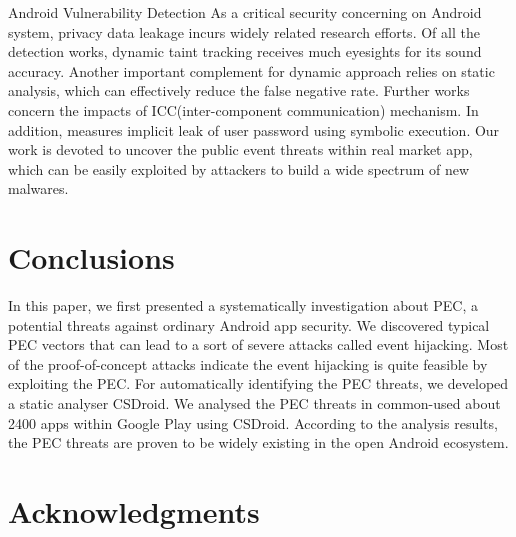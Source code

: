 \documentclass{sig-alternate-05-2015}
\begin{document}
Android Vulnerability Detection
As a critical security concerning on Android system, privacy data leakage incurs widely related research efforts. 
Of all the detection works, dynamic taint tracking \cite{enck2014taintdroid}\cite{klieber2014android}\cite{rastogi2013appsplayground}\cite{poeplau2014execute} receives much eyesights for its sound accuracy.
Another important complement for dynamic approach relies on static analysis\cite{lu2012chex}\cite{arzt2014flowdroid}\cite{gordon2015DroidSafe}, which can effectively reduce the false negative rate. Further works concern the impacts of ICC(inter-component communication) mechanism\cite{cao2015edgeminer}\cite{octeau2013epicc}\cite{li2015iccta}. In addition,
\cite{cox2014spandex} measures implicit leak of user password using symbolic execution. Our work is devoted to uncover the public event threats within real market app, which can be easily exploited by attackers to build a wide spectrum of new malwares. 
















\section{Conclusions}

In this paper, we first presented a systematically investigation about PEC, a potential threats against ordinary Android app security. We discovered typical PEC vectors that can lead to a sort of severe attacks called event hijacking. Most of the proof-of-concept attacks indicate the event hijacking is quite feasible by exploiting the PEC. For automatically identifying the PEC threats, we developed a static analyser CSDroid. We analysed the PEC threats in common-used about 2400 apps within Google Play using CSDroid. According to the analysis results, the PEC threats are proven to be widely existing in the open Android ecosystem.


\section{Acknowledgments}
\end{document}
